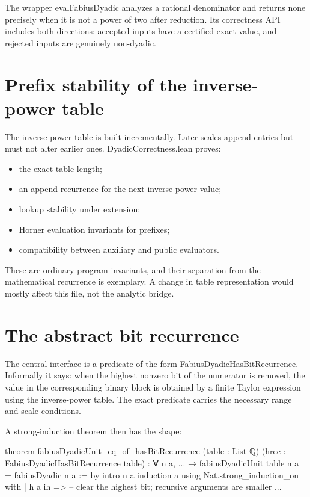 \documentclass[11pt,a4paper,openany]{book}
\def\module#1{#1.lean}
\def\decl#1{#1}
\def\code#1{#1}
\newcommand{\module}[1]{\nolinkurl{#1.lean}}
\newcommand{\decl}[1]{\texttt{\detokenize{#1}}}
\newcommand{\code}[1]{\texttt{\detokenize{#1}}}
\begin{document}
The wrapper \decl{evalFabiusDyadic} analyzes a rational denominator and returns
\code{none} precisely when it is not a power of two after reduction.  Its
correctness API includes both directions: accepted inputs have a certified
exact value, and rejected inputs are genuinely non-dyadic.

\section{Prefix stability of the inverse-power table}
The inverse-power table is built incrementally.  Later scales append entries
but must not alter earlier ones.  \module{DyadicCorrectness} proves:
\begin{itemize}
  \item the exact table length;
  \item an append recurrence for the next inverse-power value;
  \item lookup stability under extension;
  \item Horner evaluation invariants for prefixes;
  \item compatibility between auxiliary and public evaluators.
\end{itemize}
These are ordinary program invariants, and their separation from the
mathematical recurrence is exemplary.  A change in table representation would
mostly affect this file, not the analytic bridge.

\section{The abstract bit recurrence}
The central interface is a predicate of the form
\decl{FabiusDyadicHasBitRecurrence}.  Informally it says: when the highest
nonzero bit of the numerator is removed, the value in the corresponding
binary block is obtained by a finite Taylor expression using the inverse-power
table.  The exact predicate carries the necessary range and scale conditions.

A strong-induction theorem then has the shape:

\begin{LeanCode}
theorem fabiusDyadicUnit_eq_of_hasBitRecurrence
    (table : List ℚ)
    (hrec : FabiusDyadicHasBitRecurrence table) :
    ∀ n a, ... →
      fabiusDyadicUnit table n a = fabiusDyadic n a := by
  intro n a
  induction a using Nat.strong_induction_on with
  | h a ih =>
      -- clear the highest bit; recursive arguments are smaller
      ...
\end{LeanCode}
\end{document}
